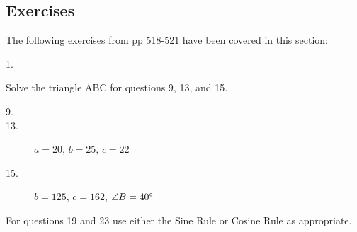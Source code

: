 \subsection{Exercises}
The following exercises from pp 518-521 have been covered in this section: 


\begin{description}
\item [1.]   
\columnsep =30pt
 \end{description}

Solve the triangle ABC for questions 9, 13, and 15. 


\begin{description}
\item [9.]    
\setlength\fboxrule{0in}\setlength\fboxsep{0.2in}


\item [13.] $a =20\text{,}$ $b =25\text{,}$ $c =22$ 

\item [15.] $b =125\text{,}$ $c =162\text{,}$ $\angle B =40 \mbox{{\ensuremath{{}^\circ}}}$ \end{description}

For questions 19 and 23 use either the Sine Rule or Cosine
Rule as appropriate. 


